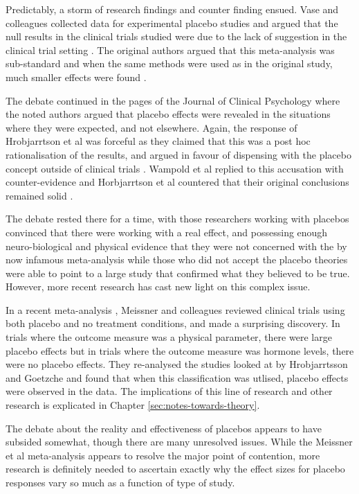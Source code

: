Predictably, a storm of research findings and counter finding ensued. Vase and colleagues collected data for experimental placebo studies and argued that the null results in the clinical trials studied were due to the lack of suggestion in the clinical trial setting \cite{Vase2002}.  The original authors argued that this meta-analysis was sub-standard and when the same methods were used as in the original study, much smaller effects were found \cite{Hrobjartsson2003}. 

The debate continued in the pages of the Journal of Clinical Psychology \cite{Wampold2005}  where the noted authors argued that placebo effects were revealed in the situations where they were expected, and not elsewhere. Again, the response of Hrobjarrtson et al was forceful as they claimed that this was a post hoc rationalisation of the results, and argued in favour of dispensing with the placebo concept outside of clinical trials \cite{Hrobjartsson2007a} . Wampold et al replied to this accusation \cite{Wampol2007}  with counter-evidence and Horbjarrtson et al countered that their original conclusions remained solid \cite{Hrobjartsson2007}. 


The debate rested there for a time, with those researchers working with placebos convinced that there were working with a real effect, and possessing enough neuro-biological and physical evidence that they were not concerned with the by now infamous meta-analysis while those who did not accept the placebo theories were able to point to a large study that confirmed what they believed to be true. However, more recent research has cast new light on this complex issue. 

In a recent meta-analysis  \cite{Meissner2007}, Meissner and colleagues reviewed clinical trials using both placebo and no treatment conditions, and made a surprising discovery. In trials where the outcome measure was a physical parameter, there were large placebo effects but in trials where the outcome measure was hormone levels, there were no placebo effects. They re-analysed the studies looked at by Hrobjarrtsson and Goetzche and found that when this classification was utlised, placebo effects were observed in the data. The implications of this line of research and other research is explicated in Chapter \ref{sec:notes-towards-theory}. 

The debate about the reality and effectiveness of placebos appears to have subsided somewhat, though there are many unresolved issues. While the Meissner et al meta-analysis appears to resolve the major point of contention, more research is definitely needed to ascertain exactly why the effect sizes for placebo responses vary so much as a function of type of study.

